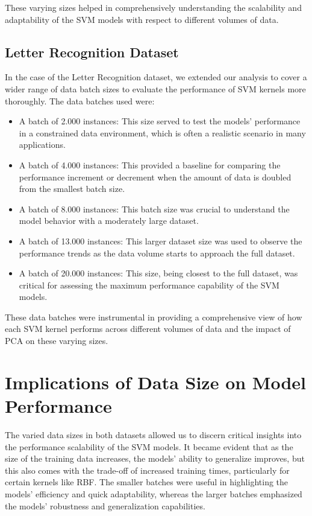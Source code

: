 \documentclass[conference]{IEEEtran}
\begin{document}
These varying sizes helped in comprehensively understanding the scalability and adaptability of the SVM models with respect to different volumes of data.

\subsection{Letter Recognition Dataset}

In the case of the Letter Recognition dataset, we extended our analysis to cover a wider range of data batch sizes to evaluate the performance of SVM kernels more thoroughly. The data batches used were:

\begin{itemize}
\item A batch of 2.000 instances: This size served to test the models' performance in a constrained data environment, which is often a realistic scenario in many applications.
\item A batch of 4.000 instances: This provided a baseline for comparing the performance increment or decrement when the amount of data is doubled from the smallest batch size.
\item A batch of 8.000 instances: This batch size was crucial to understand the model behavior with a moderately large dataset.
\item A batch of 13.000 instances: This larger dataset size was used to observe the performance trends as the data volume starts to approach the full dataset.
\item A batch of 20.000 instances: This size, being closest to the full dataset, was critical for assessing the maximum performance capability of the SVM models.
\end{itemize}

These data batches were instrumental in providing a comprehensive view of how each SVM kernel performs across different volumes of data and the impact of PCA on these varying sizes.

\section{Implications of Data Size on Model Performance}

The varied data sizes in both datasets allowed us to discern critical insights into the performance scalability of the SVM models. It became evident that as the size of the training data increases, the models' ability to generalize improves, but this also comes with the trade-off of increased training times, particularly for certain kernels like RBF. The smaller batches were useful in highlighting the models' efficiency and quick adaptability, whereas the larger batches emphasized the models' robustness and generalization capabilities.
\end{document}

